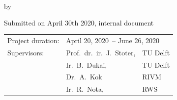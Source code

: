 \begin{titlepage}


\begin{center}


{\makeatletter
\largetitlestyle\fontsize{64}{94}\selectfont\@title
\makeatother}

{\makeatletter
\ifx\@subtitle\undefined\else
    \bigskip
   {\tudsffamily\fontsize{22}{32}\selectfont\@subtitle}    
\fi
\makeatother}

\bigskip
\bigskip

by

\bigskip
\bigskip

{\makeatletter
\largetitlestyle\fontsize{26}{26}\selectfont\@author
\makeatother}

\bigskip

Submitted on April 30th 2020, internal document

\vfill

\begin{tabular}{lll}
    Project duration: & \multicolumn{2}{l}{April 20, 2020\ -- June 26, 2020}\\
    Supervisors: & Prof.\ dr.\ ir.\ J.\ Stoter, & TU Delft\\
        & Ir.\ B.\ Dukai, & TU Delft\\
        & Dr.\ A.\ Kok\ & RIVM\\
        & Ir.\ R.\ Nota, & RWS
\end{tabular}

\bigskip
\bigskip

\bigskip
\bigskip



\end{center}


\end{titlepage}

